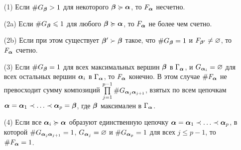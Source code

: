\begin{theorem}\label{fin_int}
\qquad
\begin{enumerate}[nolistsep]
\item[(1)] Если $\#G_{\bm{\beta}}>1$ для некоторого ${\bm{\beta}}\succcurlyeq{\bm{\alpha}}$, то  $F_{\bm{\alpha}}$ несчетно.

\item[(2a)] Если  $\#G_{\bm{\beta}}\leqslant1$ для любого ${\bm{\beta}}\succcurlyeq{\bm{\alpha}}$, то  $F_{\bm{\alpha}}$ не более чем счетно.


\item[(2b)] Если при этом существует ${\bm{\beta}}'\succ{\bm{\beta}}$ такое, что $\#G_{\bm{\beta}}=1$ и $F_{{\bm{\beta}}'}\neq\varnothing$, то $F_{\bm{\alpha}}$ счетно.

\item[(3)] Если  $\#G_{\bm{\beta}}=1$ для всех максимальных вершин ${\bm{\beta}}$ в $\Gamma_{\bm{\alpha}}$, и $G_{{\bm{\alpha}}_i}=\varnothing$ для всех остальных вершин ${\bm{\alpha}}_i$ в $\Gamma_{\bm{\alpha}}$, то $F_{\bm{\alpha}}$ конечно.
В этом случае $\#F_{\bm{\alpha}}$ не превосходит сумму   композиций $\prod \limits_{j=1}^{p-1}\# G_{{\bm{\alpha}}_j{\bm{\alpha}}_{j+1}}$, взятых по всем цепочкам ${\bm{\alpha}}={\bm{\alpha}}_1\prec\ldots\prec{\bm{\alpha}}_p={\bm{\beta}}$, где ${\bm{\beta}}$  максимален в $\Gamma_{\bm{\alpha}}$.

\item[(4)] Если все ${\bm{\alpha}}_i\succcurlyeq{\bm{\alpha}}$ образуют единственную цепочку ${\bm{\alpha}}={\bm{\alpha}}_1\prec\ldots\prec{\bm{\alpha}}_p$, в которой  $\# G_{{\bm{\alpha}}_j{\bm{\alpha}}_{j+1}}=1$, $G_{{\bm{\alpha}}_j}=\varnothing$ и $\#G_{{\bm{\alpha}}_p}=1$ для всех $j\le p-1$, то  $\#F_{\bm{\alpha}}=1$.
\end{enumerate}
\end{theorem}


